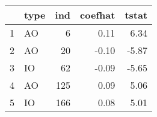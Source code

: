 % 
\begin{tabular}{rlrrr}
  \hline
 & type & ind & coefhat & tstat \\ 
  \hline
1 & AO &   6 & 0.11 & 6.34 \\ 
  2 & AO &  20 & -0.10 & -5.87 \\ 
  3 & IO &  62 & -0.09 & -5.65 \\ 
  4 & AO & 125 & 0.09 & 5.06 \\ 
  5 & IO & 166 & 0.08 & 5.01 \\ 
   \hline
\end{tabular}
